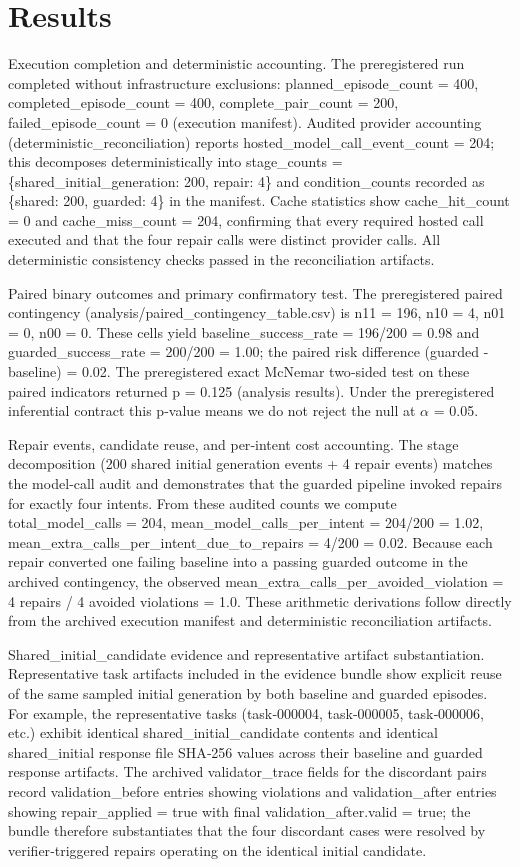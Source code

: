 \documentclass[conference]{IEEEtran}
\begin{document}
\section{Results}
Execution completion and deterministic accounting. The preregistered run completed without infrastructure exclusions: planned\_episode\_count = 400, completed\_episode\_count = 400, complete\_pair\_count = 200, failed\_episode\_count = 0 (execution manifest). Audited provider accounting (deterministic\_reconciliation) reports hosted\_model\_call\_event\_count = 204; this decomposes deterministically into stage\_counts = \{shared\_initial\_generation: 200, repair: 4\} and condition\_counts recorded as \{shared: 200, guarded: 4\} in the manifest. Cache statistics show cache\_hit\_count = 0 and cache\_miss\_count = 204, confirming that every required hosted call executed and that the four repair calls were distinct provider calls. All deterministic consistency checks passed in the reconciliation artifacts.

Paired binary outcomes and primary confirmatory test. The preregistered paired contingency (analysis/paired\_contingency\_table.csv) is n11 = 196, n10 = 4, n01 = 0, n00 = 0. These cells yield baseline\_success\_rate = 196/200 = 0.98 and guarded\_success\_rate = 200/200 = 1.00; the paired risk difference (guarded - baseline) = 0.02. The preregistered exact McNemar two‑sided test on these paired indicators returned p = 0.125 (analysis results). Under the preregistered inferential contract this p‑value means we do not reject the null at \ensuremath{\alpha} = 0.05.

Repair events, candidate reuse, and per‑intent cost accounting. The stage decomposition (200 shared initial generation events + 4 repair events) matches the model‑call audit and demonstrates that the guarded pipeline invoked repairs for exactly four intents. From these audited counts we compute total\_model\_calls = 204, mean\_model\_calls\_per\_intent = 204/200 = 1.02, mean\_extra\_calls\_per\_intent\_due\_to\_repairs = 4/200 = 0.02. Because each repair converted one failing baseline into a passing guarded outcome in the archived contingency, the observed mean\_extra\_calls\_per\_avoided\_violation = 4 repairs / 4 avoided violations = 1.0. These arithmetic derivations follow directly from the archived execution manifest and deterministic reconciliation artifacts.

Shared\_initial\_candidate evidence and representative artifact substantiation. Representative task artifacts included in the evidence bundle show explicit reuse of the same sampled initial generation by both baseline and guarded episodes. For example, the representative tasks (task‑000004, task‑000005, task‑000006, etc.) exhibit identical shared\_initial\_candidate contents and identical shared\_initial response file SHA‑256 values across their baseline and guarded response artifacts. The archived validator\_trace fields for the discordant pairs record validation\_before entries showing violations and validation\_after entries showing repair\_applied = true with final validation\_after.valid = true; the bundle therefore substantiates that the four discordant cases were resolved by verifier‑triggered repairs operating on the identical initial candidate.
\end{document}
